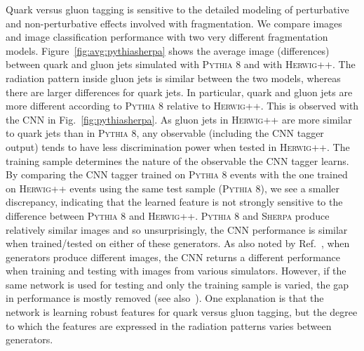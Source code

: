 Quark versus gluon tagging is sensitive to the detailed modeling of perturbative and non-perturbative effects involved with fragmentation.  
We compare images and image classification performance with two very different fragmentation models.  
Figure~\ref{fig:avg:pythiasherpa} shows the average image (differences) between quark and gluon jets simulated with 
\textsc{Pythia} 8 and with \textsc{Herwig++}.  
The radiation pattern inside gluon jets is similar between the two models, whereas there are larger differences for quark jets.  
In particular, quark and gluon jets are more different according to \textsc{Pythia} 8 relative to \textsc{Herwig++}.  
This is observed with the CNN in Fig.~\ref{fig:pythiasherpa}.  
As gluon jets in \textsc{Herwig++} are more similar to quark jets than in \textsc{Pythia} 8, 
any observable (including the CNN tagger output) tends to have less discrimination power when tested in \textsc{Herwig++}.
The training sample determines the nature of the observable the CNN tagger learns. 
By comparing the CNN tagger trained on \textsc{Pythia} 8 events with the one trained on \textsc{Herwig++} events
using the same test sample (\textsc{Pythia} 8),
we see a smaller discrepancy, indicating that the learned feature is not strongly sensitive 
to the difference between \textsc{Pythia} 8 and \textsc{Herwig++}.
\textsc{Pythia} 8 and \textsc{Sherpa} produce relatively similar images and so unsurprisingly, 
the CNN performance is similar when trained/tested on either of these generators.  
As also noted by Ref.~\cite{Barnard:2016qma}, when generators produce different images, 
the CNN returns a different performance when training and testing with images from various simulators.  
However, if the same network is used for testing and only the training sample is varied, 
the gap in performance is mostly removed (see also~\cite{Komiske:2016rsd}).  
One explanation is that the network is learning robust features for quark versus gluon tagging, 
but the degree to which the features are expressed in the radiation patterns varies between generators.


